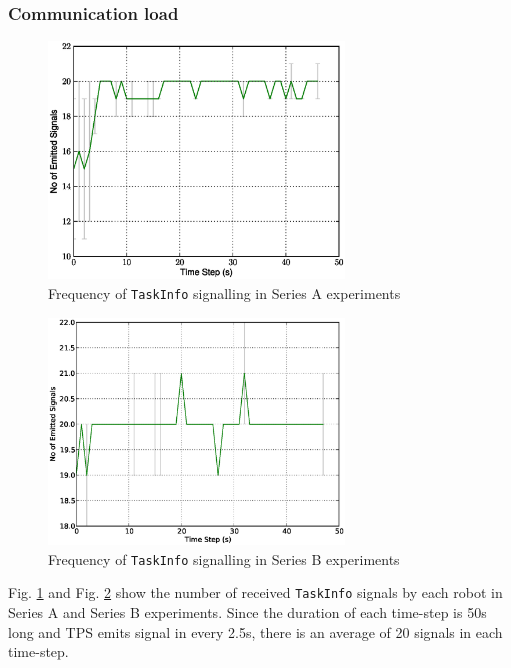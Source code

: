 \documentclass[smallcondensed]{svjour3}
\begin{document}
\subsubsection{Communication load}
\begin{figure}
\centering
\includegraphics[width=0.7\textwidth]
{images/global-8robots/8Robot-SignalingFreqStat.eps}
\caption{\small Frequency of \texttt{TaskInfo} signalling in Series A experiments}
\label{fig:signal-frequency-stat-SA} 
\end{figure}
\begin{figure}
\centering
\includegraphics[width=0.7\textwidth]{images/Global-SignalingFreqStat.eps}
\caption{\small Frequency of \texttt{TaskInfo} signalling in Series B experiments}
\label{fig:signal-frequency-stat-SB} 
\end{figure}
Fig. \ref{fig:signal-frequency-stat-SA}  and Fig. \ref{fig:signal-frequency-stat-SB}  show the number of received \texttt{TaskInfo} signals by each robot in Series A and Series B experiments. Since the duration of each time-step is 50s long and TPS emits signal in every 2.5s, there is an average of 20 signals in each time-step.
\end{document}
